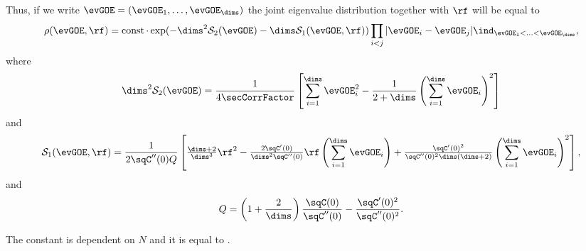 Thus, if we write $\evGOE = (\evGOE_1, \ldots, \evGOE_\dims)$ the joint eigenvalue distribution together with $\rf$ will be equal to 
\begin{align*}
    \rho(\evGOE,\rf) = \operatorname{const} \cdot \exp(- \dims^2 \mathcal{S}_2(\evGOE) - \dims \mathcal{S}_1 (\evGOE, \rf)) \prod_{i<j} |\evGOE_i - \evGOE_j| \ind_{\evGOE_1 < \ldots < \evGOE_\dims},
\end{align*}
where
\begin{align*}
    \dims^2 \mathcal{S}_2(\evGOE) = \frac{1}{4\secCorrFactor}  \left[ \sum_{i=1}^\dims \evGOE_i^2 - \frac{1}{2+\dims} \left(\sum_{i=1}^\dims \evGOE_i \right)^2 \right]
\end{align*}
and
\begin{align*}
    \mathcal{S}_1(\evGOE, \rf) = \frac1{2\sqC''(0)Q}\left[
        \tfrac{\dims+2}{\dims^3}\rf^2
        - \tfrac{2\sqC'(0)}{\dims^2\sqC''(0)}\rf\left(\sum_{i=1}^\dims \evGOE_i \right)
        + \tfrac{\sqC'(0)^2}{\sqC''(0)^2\dims(\dims+2)}\left(\sum_{i=1}^\dims \evGOE_i \right)^2
    \right],
\end{align*}
and
\[
	Q = \left(1+\frac2\dims\right)
	\frac{\sqC(0)}{\sqC''(0)} - \frac{\sqC'(0)^2}{\sqC''(0)^2}.
\]

The constant is dependent on $N$ and it is equal to .